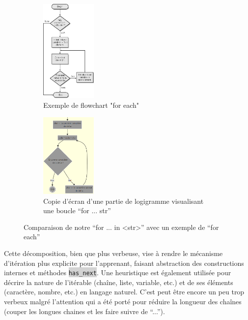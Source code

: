 \documentclass[11pt,a4paper]{article}
\let\cite\parencite
\newcommand{\code}[1]{\colorbox{lightgray}{\texttt{\small #1}}}
\begin{document}
\begin{figure}[H]
    \centering
    \begin{subfigure}{0.45\textwidth}
         \centering
         \includegraphics[width=0.3\textwidth]{FqKSJ.jpg}
        \caption{Exemple de flowchart "for each" \cite{for_each_exemple}}
        \label{fig:foreach_flowchart}
    \end{subfigure}
    \begin{subfigure}{0.45\textwidth}
        \centering
        \includegraphics[width=0.3\textwidth]{for_str_screenshot.png}
        \caption{Copie d'écran d'une partie de logigramme visualisant une boucle ``for ... str''}
        \label{fig:for_str_screenshot}
    \end{subfigure}
    \caption{Comparaison de notre ``for ... in <str>'' avec un exemple de ``for each''}
    \label{fig:deux_for}
\end{figure}

Cette décomposition, bien que plus verbeuse, vise à rendre le mécanisme d'itération plus explicite pour l'apprenant, faisant abstraction des constructions internes et méthodes \code{has_next}. 
Une heuristique est également utilisée pour décrire la nature de l'itérable (chaîne, liste, variable, etc.) et 
de ses éléments (caractère, nombre, etc.) en langage naturel. C'est peut être encore un peu trop verbeux malgré
 l'attention qui a été porté pour réduire la longueur des chaînes (couper les longues chaines et les faire suivre de ``...'').
\end{document}
